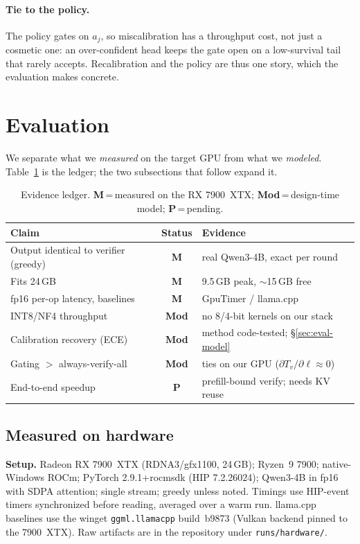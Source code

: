 \documentclass[11pt]{article}
\theoremstyle{plain}
\theoremstyle{definition}
\begin{document}
\paragraph{Tie to the policy.} The policy gates on $a_j$, so miscalibration has a
throughput cost, not just a cosmetic one: an over-confident head keeps the gate
open on a low-survival tail that rarely accepts. Recalibration and the policy are
thus one story, which the evaluation makes concrete.

\section{Evaluation}
\label{sec:eval}
We separate what we \emph{measured} on the target GPU from what we \emph{modeled}.
Table~\ref{tab:status} is the ledger; the two subsections that follow expand it.

\begin{table}[t]
\centering\small
\caption{Evidence ledger. \textbf{M}\,=\,measured on the RX 7900~XTX;
\textbf{Mod}\,=\,design-time model; \textbf{P}\,=\,pending.}
\label{tab:status}
\begin{tabular}{lcl}
\toprule
Claim & Status & Evidence \\
\midrule
Output identical to verifier (greedy) & \textbf{M} & real Qwen3-4B, exact per round \\
Fits 24\,GB                            & \textbf{M} & 9.5\,GB peak, $\sim$15\,GB free \\
fp16 per-op latency, baselines        & \textbf{M} & GpuTimer / llama.cpp \\
INT8/NF4 throughput                   & \textbf{Mod} & no 8/4-bit kernels on our stack \\
Calibration recovery (ECE)            & \textbf{Mod} & method code-tested; \S\ref{sec:eval-model} \\
Gating $>$ always-verify-all          & \textbf{Mod} & ties on our GPU ($\partial T_v/\partial\ell{\approx}0$) \\
End-to-end speedup                    & \textbf{P} & prefill-bound verify; needs KV reuse \\
\bottomrule
\end{tabular}
\end{table}

\subsection{Measured on hardware}
\label{sec:eval-measured}
\textbf{Setup.} Radeon RX 7900~XTX (RDNA3/gfx1100, 24\,GB); Ryzen~9 7900;
native-Windows ROCm; PyTorch 2.9.1+rocmsdk (HIP 7.2.26024); Qwen3-4B in fp16 with
SDPA attention; single stream; greedy unless noted. Timings use HIP-event timers
synchronized before reading, averaged over a warm run. llama.cpp baselines use
the winget \texttt{ggml.llamacpp} build~b9873 (Vulkan backend pinned to the
7900~XTX). Raw artifacts are in the repository under \texttt{runs/hardware/}.
\end{document}

